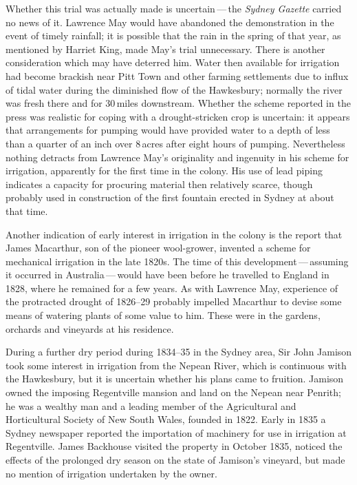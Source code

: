 Whether this trial was actually made is uncertain\,---\,the
\textsl{Sydney Gaz\-ette} carried no news of it.  Lawrence May would
have abandoned the demonstration in the event of timely rainfall; it
is possible that the rain in the spring of that year, as mentioned by
Harriet King, made May's trial unnecessary.  There is another
consideration which may have deterred him.  Water then available for
irrigation had become brackish near Pitt Town and other farming
settlements due to influx of tidal water during the diminished flow of
the Hawkesbury; normally the river was fresh there and for 30\,miles
downstream.  Whether the
scheme reported in the press was realistic for coping with a
drought-stricken crop is uncertain: it appears that arrangements for
pumping would have provided water to a depth of less than a quarter of
an inch over 8\,acres after eight hours of pumping.  Nevertheless
nothing detracts from Lawrence May's originality and ingenuity in his
scheme for irrigation, apparently for the first time in the colony.
His use of lead piping indicates a capacity for procuring material
then relatively scarce, though probably used in construction of the
first fountain erected in Sydney at about that time.

Another indication of early interest in irrigation in the colony is
the report that James Mac\-ar\-th\-ur, son of the
pioneer wool-grower, invented a scheme for mechanical irrigation in
the late 1820s.  The time of this development\,---\,assuming it occurred
in Australia\,---\,would have been before he travelled to England in
1828, where he remained for a few years.  As with Lawrence May,
experience of the protracted drought of 1826--29 probably impelled
Macarthur to devise some means of watering plants of some value to
him.  These were in the gardens, orchards and vineyards at his
residence.

During a further dry period during 1834--35 in the Sydney area, Sir
John Jamison took some interest in irrigation from
the Nepean River,  which is continuous with the
Hawkesbury, but it is uncertain whether his plans came to fruition.
Jamison owned the imposing Regentville 
mansion and land on the Nepean near Penrith;  he
was a wealthy man and a leading member of the Agricultural and
Horticultural Society of New South Wales, founded in 1822.  Early in
1835 a Sydney newspaper reported the importation of machinery for use
in irrigation at Regentville.  James Backhouse
visited the property in October 1835, noticed the effects of the
prolonged dry season on the state of Jamison's vineyard, but made no
mention of irrigation undertaken by the owner.

